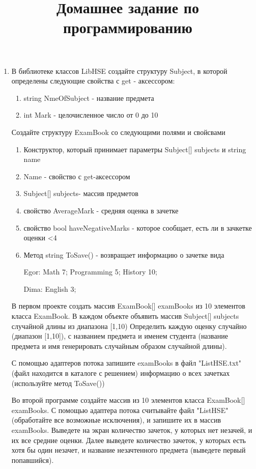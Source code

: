 \documentclass[a4paper,12pt]{article} %
\author{}
\title{Домашнее задание по программированию}
\date{}
\begin{document}
	\maketitle
	
	\begin{enumerate}
		\item В библиотеке классов LibHSE создайте структуру Subject, в которой определены следующие свойства с get - аксессором:
		\begin{enumerate}
			\item string NmeOfSubject - название предмета
			\item int Mark - целочисленное число от 0 до 10
			
		\end{enumerate}
		Создайте структуру ExamBook со следующими полями и свойсвами
		\begin{enumerate}
			\item Конструктор, который принимает параметры Subject[] subjects и string name
			\item Name  - свойство с get-аксессором
			\item Subject[] subjects- массив предметов 
			\item свойство AverageMark - средняя оценка в зачетке
			\item свойство bool haveNegativeMarks - которое сообщает, есть ли в зачкетке оценки <4
			\item Метод string ToSave() - возвращает информацию о зачетке вида
			
			
		Egor: Math 7;
			 Programming 5;
			 History 10; 
			 
			Dima: English 3;
			 \
		\end{enumerate}
		 В первом проекте создать массив ExamBook[] examBooks из 10 элементов класса ExamBook. В каждом объекте объявить массив Subject[] subjects случайной длины из диапазона [1,10) 
		 Определить каждую оценку случайно (диапазон [1,10]), с названием предмета и именем студента (название предмета и имя генерировать случайным образом случайной длины).
		 
		 С помощью адаптеров потока запишите examBooks в файл "ListHSE.txt" (файл находится в каталоге с решением) информацию о всех зачетках (используйте метод ToSave())
		 
		 Во второй программе создайте массив из 10 элементов класса ExamBook[] examBooks. С помощью адаптера потока считывайте файл "ListHSE" (обработайте все возможные исключения), и запишите их в массив examBooks. Выведете на экран количество зачеток, у которых нет незачей, и их все средние оценки. Далее выведете количество зачеток, у которых есть хотя бы один незачет, и название незачтенного предмета (выведете первый попавшийся).
		 
		 
	\end{enumerate}
	
\end{document}
